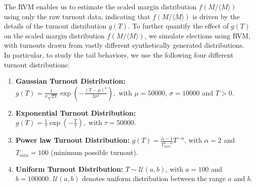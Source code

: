 \documentclass[reprint,aps,prl,showpacs,twocolumn, superscriptaddress]{revtex4-2}
\begin{document}
The RVM enables us to estimate the scaled margin distribution $f(M / \langle M \rangle)$ using only the raw turnout data, indicating that $f(M / \langle M \rangle)$ is driven by the details of the turnout distribution $g(T)$. To further quantify the effect of $g(T)$ on the scaled margin distribution $f(M / \langle M \rangle)$, we simulate elections using RVM, with turnouts drawn from vastly different synthetically generated distributions. In particular, to study the tail behaviors, we use the following four different turnout distributions:
\begin{enumerate}
    \item \textbf{Gaussian Turnout Distribution:} $g(T) = \frac{1}{\sigma\sqrt{2\pi}}\exp\left(-\frac{(T - \mu)^2}{2\sigma^2}\right), \text{ with } \mu = 50000$, $\sigma = 10000$ and $T > 0$.
    \item \textbf{Exponential Turnout Distribution:} $g(T) = \frac{1}{\tau} \exp{\left(-\frac{T}{\tau}\right)}, \text{ with } \tau = 50000$.
    \item \textbf{Power law Turnout Distribution:} $g(T) = \frac{\alpha - 1}{T_{min} ^{1 -\alpha}} T ^ {-\alpha}$, with $\alpha = 2$ and $T_{min} = 100$ (minimum possible turnout).
    \item \textbf{Uniform Turnout Distribution:} $T \sim \mathcal{U} (a, b)$, with $a = 100$ and $b = 100000$. $\mathcal{U}(a, b)$ denotes uniform distribution between the range $a$ and $b$.
\end{enumerate}
\end{document}
